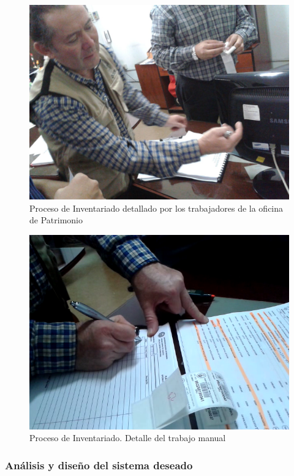 \begin{figure}[h!]
  \centering
  \includegraphics[scale=0.2]{images/activities/camila/inventariado-1.jpg}
  \caption{Proceso de Inventariado detallado por los trabajadores de la oficina de Patrimonio}
  \label{fig:inventariado1}
\end{figure}

\begin{figure}[h!]
  \centering
  \includegraphics[scale=0.4]{images/activities/camila/inventariado-2.png}
  \caption{Proceso de Inventariado. Detalle del trabajo manual}
  \label{fig:inventariado2}
\end{figure}


\subsubsection{Análisis y diseño del sistema deseado}

